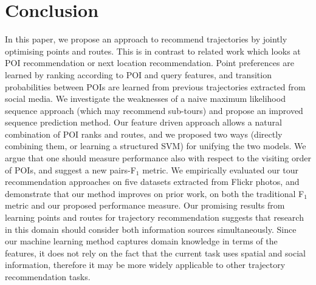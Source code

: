 \section{Conclusion}
\label{sec:conclusion}

In this paper, we propose an approach to recommend trajectories
by jointly optimising points and routes.
This is in contrast to related work which looks at
POI recommendation or next location recommendation.
Point preferences are learned by ranking according to POI and query features,
and transition probabilities between POIs are learned from previous trajectories extracted
from social media.
We investigate the weaknesses of a naive maximum likelihood sequence approach (which
may recommend sub-tours) and propose an improved sequence prediction method.
Our feature driven approach allows a natural combination of POI ranks and routes,
and we proposed two ways (directly combining them, or learning a structured SVM)
for unifying the two models.
We argue that one should measure performance also with respect to the visiting order of POIs, 
and suggest a new pairs-F$_1$ metric.
We empirically evaluated our tour recommendation approaches on five datasets extracted from
Flickr photos, and demonstrate that our method improves on prior work, on both the traditional
F$_1$ metric and our proposed performance measure.
Our promising results from learning points and routes for trajectory recommendation suggests
that research in this domain should consider both information sources simultaneously.
Since our machine learning method captures domain knowledge in terms of the features,
it does not rely on the fact that the current task uses spatial and social information,
therefore it may be more widely applicable to other trajectory recommendation tasks.
